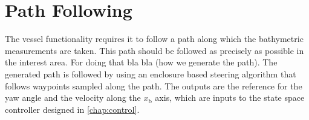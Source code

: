 \chapter{Path Following}

The vessel functionality requires it to follow a path along which the bathymetric measurements are taken. This path should be followed as precisely as possible in the interest area. For doing that bla bla (how we generate the path). The generated path is followed by using an enclosure based steering algorithm \cite[pp. 258-265]{TFossen} that follows waypoints sampled along the path. The outputs are the reference for the yaw angle and the velocity along the $x_\mathrm{b}$ axis, which are inputs to the state space controller designed in \autoref{chap:control}. 